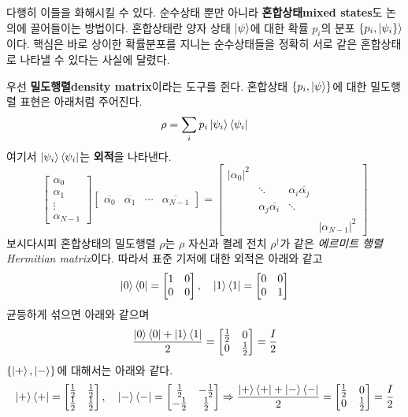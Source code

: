 \documentclass[a4paper,chapter,atbegshi]{oblivoir}
\begin{document}
다행히 이들을 화해시킬 수 있다. 순수상태 뿐만 아니라 
\textbf{혼합상태\tiny mixed states}도 논의에 끌어들이는 방법이다. 혼합상태란
양자 상태 $\ket{\psi}$에 대한 확률 $p_i$의 분포 $\{p_i,\ket{\psi_i\}}$이다.
핵심은 바로 상이한 확률분포를 지니는 순수상태들을 정확히
서로 같은 혼합상태로 나타낼 수 있다는 사실에 달렸다. 

우선 \textbf{밀도행렬\tiny density matrix}이라는 도구를 쥔다. 혼합상태 
$\{p_i,\ket{\psi}\}$에 대한 밀도행렬 표현은 아래처럼 주어진다. 
\begin{equation}
  \rho = \sum_i p_i\ket{\psi_i}\bra{\psi_i}
\end{equation}
여기서 $\ket{\psi_i}\bra{\psi_i}$는 \textbf{외적}을 나타낸다.
\[
  \begin{bmatrix}\alpha_0\\\alpha_1\\\vdots\\\alpha_{N-1}\end{bmatrix}
  \begin{bmatrix}\overline{\alpha_0} & \overline{\alpha_1} &\cdots 
  &\overline{\alpha_{N-1}}\end{bmatrix} = \begin{bmatrix}
    |\alpha_0|^2 & & &  \\
    & \ddots & \alpha_i\overline{\alpha_j}& \\
    &\alpha_j\overline{\alpha_i}&\ddots&\\
    &&&|\alpha_{N-1}|^2
  \end{bmatrix}
\]
보시다시피 혼합상태의 밀도행렬 $\rho$는 $\rho$ 자신과 켤레 전치 $\rho^{\dagger}$가
같은 \emph{에르미트 행렬\tiny Hermitian matrix}이다. 따라서 표준 기저에 
대한 외적은 아래와 같고
\[
  \ket0\bra0=\begin{bmatrix}1&0\\0&0\end{bmatrix},\quad
  \ket1\bra1=\begin{bmatrix}0&0\\0&1\end{bmatrix}
\]
균등하게 섞으면 아래와 같으며
\[
  \frac{\ket0\bra0+\ket1\bra1}{2} =
  \begin{bmatrix}\frac{1}{2}&0\\0&\frac{1}{2}\end{bmatrix}
  =\frac{I}{2}
\]
$\{\ket+,\ket-\}$에 대해서는 아래와 같다.
\[
  \ket+\bra+=\begin{bmatrix}\frac{1}{2}&\frac{1}{2}\\\frac{1}{2}&\frac{1}{2}\end{bmatrix},\quad
  \ket-\bra-=\begin{bmatrix}\frac{1}{2}&-\frac{1}{2}\\-\frac{1}{2}&\frac{1}{2}\end{bmatrix}
  \Rightarrow\frac{\ket+\bra++\ket-\bra-}{2}=\begin{bmatrix}\frac{1}{2}&0\\0&\frac{1}{2}\end{bmatrix}=\frac{I}{2}
\]
\end{document}
